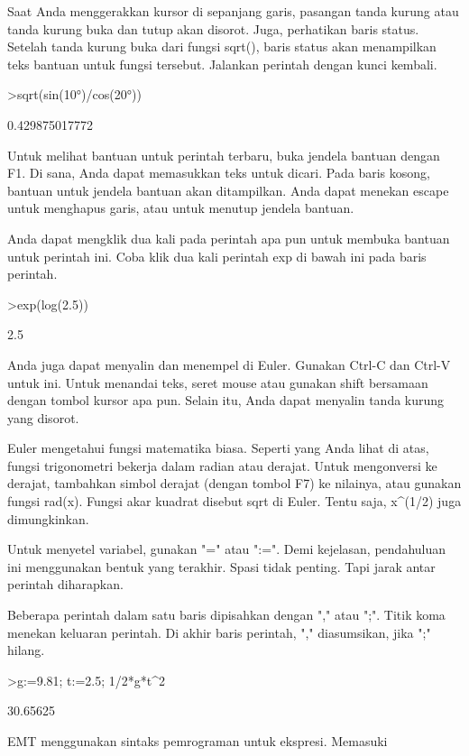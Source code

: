 \documentclass{article}
\begin{document}
\begin{eulernotebook}
\begin{eulercomment}
Saat Anda menggerakkan kursor di sepanjang garis, pasangan tanda
kurung atau tanda kurung buka dan tutup akan disorot. Juga, perhatikan
baris status. Setelah tanda kurung buka dari fungsi sqrt(), baris
status akan menampilkan teks bantuan untuk fungsi tersebut. Jalankan
perintah dengan kunci kembali.
\end{eulercomment}
\begin{eulerprompt}
>sqrt(sin(10°)/cos(20°))
\end{eulerprompt}
\begin{euleroutput}
  0.429875017772
\end{euleroutput}
\begin{eulercomment}
Untuk melihat bantuan untuk perintah terbaru, buka jendela bantuan
dengan F1. Di sana, Anda dapat memasukkan teks untuk dicari. Pada
baris kosong, bantuan untuk jendela bantuan akan ditampilkan. Anda
dapat menekan escape untuk menghapus garis, atau untuk menutup jendela
bantuan.

Anda dapat mengklik dua kali pada perintah apa pun untuk membuka
bantuan untuk perintah ini. Coba klik dua kali perintah exp di bawah
ini pada baris perintah.
\end{eulercomment}
\begin{eulerprompt}
>exp(log(2.5))
\end{eulerprompt}
\begin{euleroutput}
  2.5
\end{euleroutput}
\begin{eulercomment}
Anda juga dapat menyalin dan menempel di Euler. Gunakan Ctrl-C dan
Ctrl-V untuk ini. Untuk menandai teks, seret mouse atau gunakan shift
bersamaan dengan tombol kursor apa pun. Selain itu, Anda dapat
menyalin tanda kurung yang disorot.
\end{eulercomment}
\begin{eulercomment}
Euler mengetahui fungsi matematika biasa. Seperti yang Anda lihat di
atas, fungsi trigonometri bekerja dalam radian atau derajat. Untuk
mengonversi ke derajat, tambahkan simbol derajat (dengan tombol F7) ke
nilainya, atau gunakan fungsi rad(x). Fungsi akar kuadrat disebut sqrt
di Euler. Tentu saja, x\textasciicircum{}(1/2) juga dimungkinkan.

Untuk menyetel variabel, gunakan "=" atau ":=". Demi kejelasan,
pendahuluan ini menggunakan bentuk yang terakhir. Spasi tidak penting.
Tapi jarak antar perintah diharapkan.

Beberapa perintah dalam satu baris dipisahkan dengan "," atau ";".
Titik koma menekan keluaran perintah. Di akhir baris perintah, ","
diasumsikan, jika ";" hilang.
\end{eulercomment}
\begin{eulerprompt}
>g:=9.81; t:=2.5; 1/2*g*t^2
\end{eulerprompt}
\begin{euleroutput}
  30.65625
\end{euleroutput}
\begin{eulercomment}
EMT menggunakan sintaks pemrograman untuk ekspresi. Memasuki


\end{eulercomment}
\end{eulernotebook}
\end{document}
